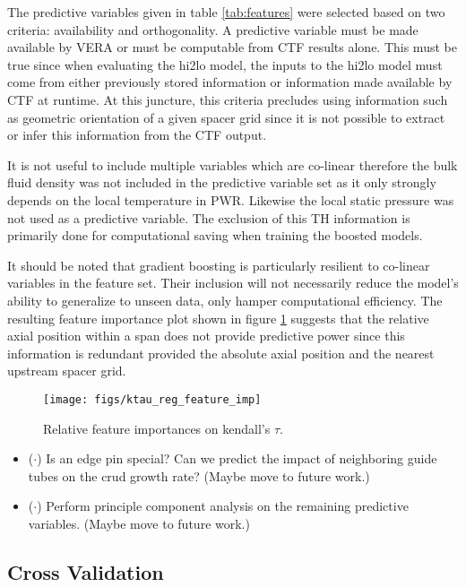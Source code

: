 The predictive variables given in table \ref{tab:features} were selected based on two criteria:  availability and orthogonality.  A predictive variable must be made available by VERA or must be computable from CTF results alone.  This must be true since when evaluating the hi2lo model, the inputs to the hi2lo model must come from either previously stored information or information made available by CTF at runtime.  At this juncture, this criteria precludes using information such as geometric orientation of a given spacer grid since it is not possible to extract or infer this information from the CTF output.

It is not useful to include multiple variables which are co-linear therefore the bulk fluid density was not included in the predictive variable set as it only strongly depends on the local temperature in PWR. Likewise the local static pressure was not used as a predictive variable.  The exclusion of this TH information is primarily done for computational saving when training the boosted models.  

It should be noted that gradient boosting is particularly resilient to co-linear variables in the feature set.  Their inclusion will not necessarily reduce the model's ability to generalize to unseen data, only hamper computational efficiency.  The resulting feature importance plot shown in figure \ref{fig:ktauregfeatureimp} suggests that the relative axial position within a span does not provide predictive power since this information is redundant provided the absolute axial position and the nearest upstream spacer grid.  

\begin{figure}[H]
    \centering
    \texttt{[image: figs/ktau\_reg\_feature\_imp]}
    \caption[Relative feature importance.]{Relative feature importances on kendall's $\tau$.}
    \label{fig:ktauregfeatureimp}
\end{figure}

\begin{itemize}
	\item ($\cdot$) Is an edge pin special?  Can we predict the impact of neighboring
	guide tubes on the crud growth rate?  (Maybe move to future work.)
	\item ($\cdot$) Perform principle component analysis on the remaining predictive variables. (Maybe move to future work.)
	
\end{itemize}


\subsection{Cross Validation}

